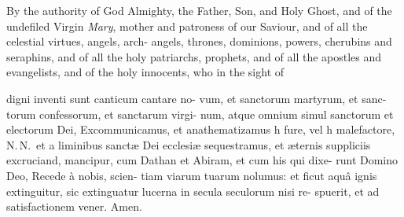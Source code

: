 \documentclass{article}
\begin{document}
\lqq By the authority of God Almighty,\break
\lqq the Father, Son, and Holy Ghost, and\break
\lqq of the undefiled Virgin \textit{Mary}, mother
\lqq and patroness of our Saviour, and of\break
\lqq all the celestial virtues, angels, arch-\break
\lqq angels, thrones, dominions, powers,\break
\lqq cherubins and seraphins, and of all the\break
\lqq holy patriarchs, prophets, and of all\break
\lqq the apostles and evangelists, and of the\break
\lqq holy innocents, who in the sight of

\noindent
digni inventi sunt canticum cantare no-\break
vum, et sanctorum martyrum, et sanc-\break
torum confessorum, et sanctarum virgi-\break
num, atque omnium simul sanctorum et\break
electorum Dei, \tsh Excommunicamus, et\break
anathematizamus h
fure, vel h\break
malefactore, N.\,N.\, et a liminibus sanctæ\break
Dei ecclesiæ sequestramus, et æternis\break
suppliciis excruciand,
mancipur, cum\break
Dathan et Abiram, et cum his qui dixe-\break
runt Domino Deo, Recede à nobis, scien-\break
tiam viarum tuarum nolumus: et ficut\break
aquâ ignis extinguitur, sic extinguatur\break
lucerna  in secula seculorum nisi re-\break
spuerit, et ad satisfactionem vener.\break
Amen.


\newpage
\bigskip\noindent
{}
\newpage
\end{document}
